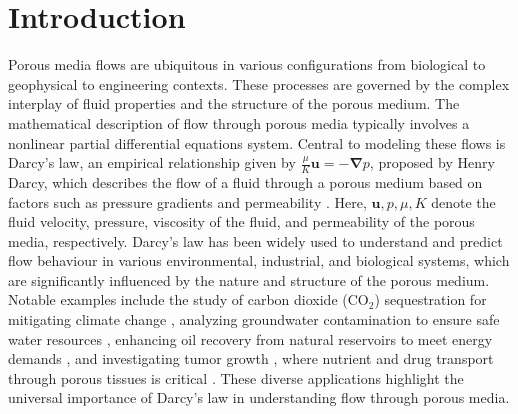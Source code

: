 \documentclass[final,3p,times]{elsarticle}
\theoremstyle{plain}
\theoremstyle{remark}
\theoremstyle{plain}
\theoremstyle{remark}
\begin{document}
\section{Introduction}

Porous media flows are ubiquitous in various configurations from biological to geophysical to engineering contexts. These processes are governed by the complex interplay of fluid properties and the structure of the porous medium. The mathematical description of flow through porous media typically involves a nonlinear partial differential equations system. Central to modeling these flows is Darcy's law, an empirical relationship given by $ \displaystyle \frac{\mu}{K}\mathbf u = -\boldsymbol{\boldsymbol{\nabla}} p$, proposed by Henry Darcy, which describes the flow of a fluid through a porous medium based on factors such as pressure gradients and permeability \citep{darcy1856}. Here, $\mathbf u, p, \mu, K$ denote the fluid velocity, pressure, viscosity of the fluid, and permeability of the porous media, respectively. Darcy's law has been widely used to understand and predict flow behaviour in various environmental, industrial, and biological systems, which are significantly influenced by the nature and structure of the porous medium. Notable examples include the study of carbon dioxide (CO$_2$) sequestration for mitigating climate change \cite{huppert2014fluid}, analyzing groundwater contamination to ensure safe water resources \citep{neuzil1986groundwater}, enhancing oil recovery from natural reservoirs to meet energy demands \cite{homsy1987viscous}, and investigating tumor growth \cite{zheng2022tumor}, where nutrient and drug transport through porous tissues is critical \citep{molz1986simulation}. These diverse applications highlight the universal importance of Darcy's law in understanding flow through porous media. 
\end{document}
